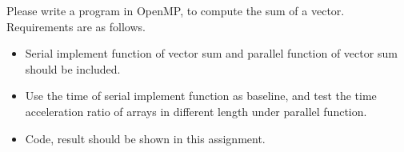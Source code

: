 \begin{exercise}[]{
    \item Please write a program in OpenMP, to compute the sum of a vector. Requirements are as follows.
    \begin{itemize}
        \item Serial implement function of vector sum and parallel function of vector sum should be included.
        \item Use the time of serial implement function as baseline, and test the time acceleration ratio of arrays in different length under parallel function. 
        \item Code, result should be shown in this assignment.
    \end{itemize}}
  \begin{solution}
  \par{~}
  \end{solution}
  \label{ex3}
\end{exercise}